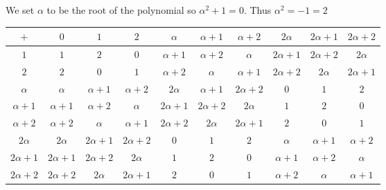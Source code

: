 \documentclass{article}
\numberwithin{equation}{subsection}
\begin{document}
		We set $\alpha $ to be the root of the polynomial so $\alpha^2+1 = 0$. Thus $\alpha^2 = -1 = 2$

		\begin{center}
			\begin{tabular}{| c | | c | c | c | c | c | c | c | c | c |}
				\hline
				$+$ 				& $0$ &	$1$	&	$2$	&	$\alpha$	&	$\alpha +1$	& $\alpha +2$	&	$2\alpha$	&	$2\alpha +1$	&	$2\alpha +2$\\ \hline \hline
				$1$					&	$1$	&	$2$	&	$0$	&	$\alpha +1$	&	$\alpha +2$	&	$\alpha$	&	$2\alpha+1$	&	$2\alpha +2$	&	$2\alpha$	\\ \hline	
				$2$					&	$2$	&	$0$	&	$1$	&	$\alpha +2$	&	$\alpha$	&	$\alpha +1$	&	$2\alpha+2$	&	$2\alpha$	&	$2\alpha+1$	\\ \hline	
				$\alpha$		&	$\alpha$	&	$\alpha+1$	&	$\alpha +2$	&	$2\alpha$	&	$\alpha+1$	&	$2\alpha+2$	&	$0$	&	$1$	&	$2$	\\ \hline	
				$\alpha +1$	&	$\alpha+1$	&	$\alpha+2$	&	$\alpha$	&	$2\alpha+1$	&	$2\alpha+2$	&	$2\alpha$	&	$1$	&	$2$	&	$0$	\\ \hline	
				$\alpha +2$	&	$\alpha +2$	&	$\alpha$	&	$\alpha+1$	&	$2\alpha+2$	&	$2\alpha$	&	$2\alpha+1$	&	$2$	&	$0$	&	$1$	\\ \hline	
				$2\alpha$		&	$2\alpha$	&	$2\alpha+1$	&	$2\alpha+2$	&	$0$	&	$1$	&	$2$	&	$\alpha$	&	$\alpha+1$	&	$\alpha+2$	\\ \hline	
				$2\alpha +1$&	$2\alpha+1$	&	$2\alpha+2$	&	$2\alpha$	&	$1$	&	$2$	&	$0$	&	$\alpha+1$	&	$\alpha+2$	&	$\alpha$	\\ \hline
				$2\alpha+2$	&	$2\alpha+2$	&	$2\alpha$	&	$2\alpha +1$	&	$2$	&	$0$	&	$1$	&	$\alpha+2$	&	$\alpha$	&	$\alpha+1$	\\ \hline	
			\end{tabular}
		\end{center}
\end{document}
